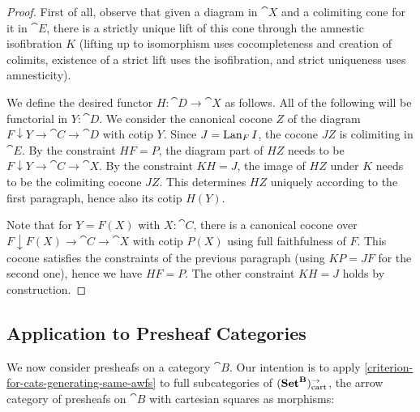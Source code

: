 \documentclass[reqno,10pt,a4paper,oneside]{amsart}
\begin{document}
\begin{proof}
First of all, observe that given a diagram in $\cat{X}$ and a colimiting cone for it in $\cat{E}$, there is a strictly unique lift of this cone through the amnestic isofibration $K$ (lifting up to isomorphism uses cocompleteness and creation of colimits, existence of a strict lift uses the isofibration, and strict uniqueness uses amnesticity).

We define the desired functor $H : \cat{D} \to \cat{X}$ as follows.
All of the following will be functorial in $Y : \cat{D}$.
We consider the canonical cocone $Z$ of the diagram $F \downarrow Y \to \cat{C} \to \cat{D}$ with cotip $Y$.
Since $J = \operatorname{Lan}_F I$, the cocone $JZ$ is colimiting in $\cat{E}$.
By the constraint $HF = P$, the diagram part of $HZ$ needs to be $F \downarrow Y \to \cat{C} \to \cat{X}$.
By the constraint $KH = J$, the image of $HZ$ under $K$ needs to be the colimiting cocone $JZ$.
This determines $HZ$ uniquely according to the first paragraph, hence also its cotip $H(Y)$.

Note that for $Y = F(X)$ with $X : \cat{C}$, there is a canonical cocone over $F \downarrow F(X) \to \cat{C} \to \cat{X}$ with cotip $P(X)$ using full faithfulness of $F$.
This cocone satisfies the constraints of the previous paragraph (using $KP = JF$ for the second one), hence we have $HF = P$.
The other constraint $KH = J$ holds by construction.
\end{proof}

\subsection{Application to Presheaf Categories}

We now consider presheafs on a category $\cat{B}$.
Our intention is to apply \cref{criterion-for-cats-generating-same-awfs} to full subcategories of $(\mathbf{Set}^{\mathbf{B}})_{\text{\normalfont{cart}}}^{\to}$, the arrow category of presheafs on $\cat{B}$ with cartesian squares as morphisms:
\end{document}
